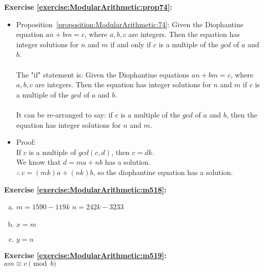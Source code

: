 \noindent\textbf{Exercise \ref{exercise:ModularArithmetic:prop74}:} %
\begin{itemize}
\item 
Proposition~\ref{proposition:ModularArithmetic:74}: Given the Diophantine equation $an + bm = c$, where $a,b,c$ are integers. Then the equation has integer solutions for $n$ and $m$ if and only if $c$ is a multiple of the $gcd$ of $a$ and $b$.\\
\\     
The "if" statement is: Given the Diophantine equations $an + bm = c$, where $a,b,c$ are integers. Then the equation has integer solutions for $n$ and $m$ if $c$ is a multiple of the $gcd$ of $a$ and $b$.\\
\\   
It can be re-arranged to say: if $c$ is a multiple of the $gcd$ of $a$ and $b$, then the equation has integer solutions for $n$ and $m$.
        
\item 
Proof:\\
If $c$ is a multiple of $gcd(c,d)$, then $c = dk$.\\
We know that $d = ma + nb$ has a solution.\\
$\therefore\ c = (mk)a + (nk)b$, so the diophantine equation has a solution. 
\end{itemize}

\noindent\textbf{Exercise \ref{exercise:ModularArithmetic:m518}:}%
\begin{enumerate}[(a)]
\item
$m=1590-119k$ $n=242k-3233$

\item 
$x=m$

\item
$y=n$
\end{enumerate}

\noindent\textbf{Exercise \ref{exercise:ModularArithmetic:m519}:}\\%
$am \equiv c \pmod{b}$\\

